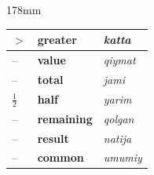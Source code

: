 \documentclass[a4paper]{article}
\begin{document}
\begin{textblock*}{178mm}
{\begin{tabular}{|>{\centering\arraybackslash}p{22mm}|p{68mm}|p{72mm}|}
$>$ & \textbf{greater} & \textit{katta} \\ \hline
\rowcolor{badge!18}
-- & \textbf{value} & \textit{qiymat} \\ \hline
-- & \textbf{total} & \textit{jami} \\ \hline
\rowcolor{badge!18}
$\frac{1}{2}$ & \textbf{half} & \textit{yarim} \\ \hline
-- & \textbf{remaining} & \textit{qolgan} \\ \hline
\rowcolor{badge!18}
-- & \textbf{result} & \textit{natija} \\ \hline
-- & \textbf{common} & \textit{umumiy} \\ \hline
\end{tabular}
}
\end{textblock*}
\end{document}
